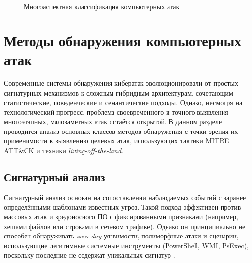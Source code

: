 \begin{figure}[h]
\centering
{}
\caption{Многоаспектная классификация компьютерных атак}
\label{fig:attack_classification}
\end{figure}

\section{Методы обнаружения компьютерных атак}

Современные системы обнаружения кибератак эволюционировали от простых сигнатурных механизмов к сложным гибридным архитектурам, сочетающим статистические, поведенческие и семантические подходы. Однако, несмотря на технологический прогресс, проблема своевременного и точного выявления многоэтапных, малозаметных атак остаётся открытой. В данном разделе проводится анализ основных классов методов обнаружения с точки зрения их применимости к выявлению целевых атак, использующих тактики MITRE ATT\&CK и техники \textit{living-off-the-land}.

\subsection{Сигнатурный анализ}

Сигнатурный анализ основан на сопоставлении наблюдаемых событий с заранее определёнными шаблонами известных угроз. Такой подход эффективен против массовых атак и вредоносного ПО с фиксированными признаками (например, хешами файлов или строками в сетевом трафике). Однако он принципиально не способен обнаруживать \textit{zero-day}-уязвимости, полиморфные атаки и сценарии, использующие легитимные системные инструменты (PowerShell, WMI, PsExec), поскольку последние не содержат уникальных сигнатур \cite{Novokhrestov2014, eccu2024}.

